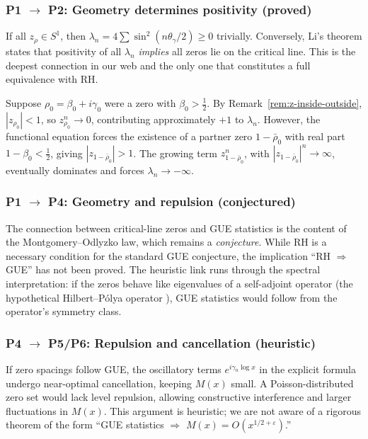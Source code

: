 \documentclass[11pt,a4paper]{article}
\theoremstyle{definition}
\begin{document}
\subsubsection*{P1 $\to$ P2: Geometry determines positivity (proved)}

If all $z_\rho \in S^1$, then $\lambda_n = 4\sum \sin^2(n\theta_\gamma/2) \geq 0$ trivially. Conversely, Li's theorem states that positivity of all $\lambda_n$ \emph{implies} all zeros lie on the critical line. This is the deepest connection in our web and the only one that constitutes a full equivalence with RH.

Suppose $\rho_0 = \beta_0 + i\gamma_0$ were a zero with $\beta_0 > \tfrac{1}{2}$. By Remark~\ref{rem:z-inside-outside}, $|z_{\rho_0}| < 1$, so $z_{\rho_0}^n \to 0$, contributing approximately $+1$ to $\lambda_n$. However, the functional equation forces the existence of a partner zero $1 - \bar{\rho}_0$ with real part $1 - \beta_0 < \tfrac{1}{2}$, giving $|z_{1-\bar{\rho}_0}| > 1$. The growing term $z_{1-\bar{\rho}_0}^n$, with $|z_{1-\bar{\rho}_0}|^n \to \infty$, eventually dominates and forces $\lambda_n \to -\infty$.

\subsubsection*{P1 $\to$ P4: Geometry and repulsion (conjectured)}

The connection between critical-line zeros and GUE statistics is the content of the Montgomery--Odlyzko law, which remains a \emph{conjecture}. While RH is a necessary condition for the standard GUE conjecture, the implication ``RH $\Rightarrow$ GUE'' has not been proved. The heuristic link runs through the spectral interpretation: if the zeros behave like eigenvalues of a self-adjoint operator (the hypothetical Hilbert--P\'olya operator \cite{BerryKeating1999}), GUE statistics would follow from the operator's symmetry class.

\subsubsection*{P4 $\to$ P5/P6: Repulsion and cancellation (heuristic)}

If zero spacings follow GUE, the oscillatory terms $e^{i\gamma_n \log x}$ in the explicit formula undergo near-optimal cancellation, keeping $M(x)$ small. A Poisson-distributed zero set would lack level repulsion, allowing constructive interference and larger fluctuations in $M(x)$. This argument is heuristic; we are not aware of a rigorous theorem of the form ``GUE statistics $\Rightarrow$ $M(x) = O(x^{1/2+\varepsilon})$.''
\end{document}
